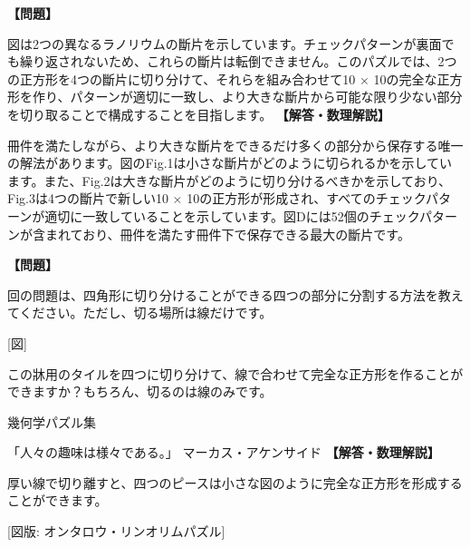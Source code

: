 \documentclass[10pt,a4paper,oneside,openany]{ltjsbook}
\begin{document}
\begin{tcolorbox}[colback=softblue,colframe=primaryblue,title=\textbf{第 176 問：ラノリウム切り方 （原題: LINOLEUM CUTTING.）},arc=2mm,boxrule=1pt,breakable]
\textbf{【問題】}\par\vspace{0.3em}
図は2つの異なるラノリウムの斷片を示しています。チェックパターンが裏面でも繰り返されないため、これらの斷片は転倒できません。このパズルでは、2つの正方形を4つの斷片に切り分けて、それらを組み合わせて10 × 10の完全な正方形を作り、パターンが適切に一致し、より大きな斷片から可能な限り少ない部分を切り取ることで構成することを目指します。
\tcblower
\textbf{【解答・数理解説】}\par\vspace{0.3em}
冊件を満たしながら、より大きな斷片をできるだけ多くの部分から保存する唯一の解法があります。図のFig.1は小さな斷片がどのように切られるかを示しています。また、Fig.2は大きな斷片がどのように切り分けるべきかを示しており、Fig.3は4つの斷片で新しい10 × 10の正方形が形成され、すべてのチェックパターンが適切に一致していることを示しています。図Dには52個のチェックパターンが含まれており、冊件を満たす冊件下で保存できる最大の斷片です。
\end{tcolorbox}

\begin{tcolorbox}[colback=softblue,colframe=primaryblue,title=\textbf{第 177 問：ANOTHER LINOLEUM PUZZLE.},arc=2mm,boxrule=1pt,breakable]
\textbf{【問題】}\par\vspace{0.3em}
回の問題は、四角形に切り分けることができる四つの部分に分割する方法を教えてください。ただし、切る場所は線だけです。

[図]

この牀用のタイルを四つに切り分けて、線で合わせて完全な正方形を作ることができますか？もちろん、切るのは線のみです。

幾何学パズル集

「人々の趣味は様々である。」
マーカス・アケンサイド
\tcblower
\textbf{【解答・数理解説】}\par\vspace{0.3em}
厚い線で切り離すと、四つのピースは小さな図のように完全な正方形を形成することができます。

[図版: オンタロウ・リンオリムパズル]
\end{tcolorbox}
\end{document}
